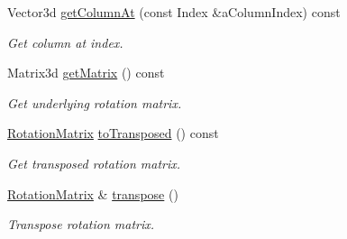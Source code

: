 \begin{DoxyCompactItemize}
Vector3d \hyperlink{classlibrary_1_1math_1_1geom_1_1d3_1_1trf_1_1rot_1_1_rotation_matrix_a020c6a8fd9b9c680908071b57b2a3422}{get\+Column\+At} (const Index \&a\+Column\+Index) const
\begin{DoxyCompactList}\small\item\em Get column at index. \end{DoxyCompactList}\item 
Matrix3d \hyperlink{classlibrary_1_1math_1_1geom_1_1d3_1_1trf_1_1rot_1_1_rotation_matrix_a374f061f73921d59caf9ce7c18ff0d91}{get\+Matrix} () const
\begin{DoxyCompactList}\small\item\em Get underlying rotation matrix. \end{DoxyCompactList}\item 
\hyperlink{classlibrary_1_1math_1_1geom_1_1d3_1_1trf_1_1rot_1_1_rotation_matrix}{Rotation\+Matrix} \hyperlink{classlibrary_1_1math_1_1geom_1_1d3_1_1trf_1_1rot_1_1_rotation_matrix_a42f35e00e2820b2d882e6abe494f8350}{to\+Transposed} () const
\begin{DoxyCompactList}\small\item\em Get transposed rotation matrix. \end{DoxyCompactList}\item 
\hyperlink{classlibrary_1_1math_1_1geom_1_1d3_1_1trf_1_1rot_1_1_rotation_matrix}{Rotation\+Matrix} \& \hyperlink{classlibrary_1_1math_1_1geom_1_1d3_1_1trf_1_1rot_1_1_rotation_matrix_a38307ba9d313c524745396338563be04}{transpose} ()
\begin{DoxyCompactList}\small\item\em Transpose rotation matrix. \end{DoxyCompactList}\end{DoxyCompactItemize}
